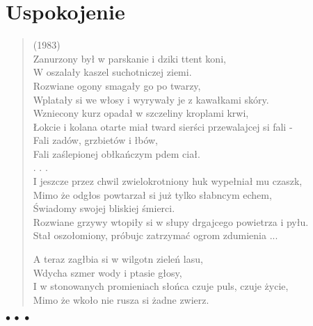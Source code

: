 \documentclass{article} %
\newenvironment{wierszd}[2]
	{\begin{verse} \hspace*{-1em}{\bf #1}\hfill{\small{(#2)}}\\[.5ex] }
	{\end{verse} \begin{center}$\bullet\ \bullet\ \bullet$\end{center}}
\newcommand{\chap}[1]{\newpage\section*{#1}}
\newcommand{\e}{\eob}
\renewcommand{\a}{\aob}
\renewcommand{\o}{\'{o}}
\newcommand{\n}{\'{n}}
\newcommand{\s}{\'{s}}
\renewcommand{\S}{\'{S}}
\newcommand{\ci}{\'{c}}
\begin{document}
\chap{Uspokojenie}\vspace*{-3ex}

\begin{wierszd}{}{1983}
Zanurzony by{\l} w parskanie i dziki t{\e}tent koni, \\  
W oszala{\l}y kaszel suchotniczej ziemi. \\ 
Rozwiane ogony smaga{\l}y go po twarzy, \\ 
Wplata{\l}y si{\e} we w{\l}osy i wyrywa{\l}y je z kawa{\l}kami sk{\o}ry. \\ 
Wzniecony kurz opada{\l} w szczeliny kroplami krwi, \\ 
{\L}okcie i kolana otarte mia{\l} tward{\a} sier{\s}ci{\a} przewalaj{\a}cej si{\e} fali - \\ 
Fali zad{\o}w, grzbiet{\o}w i {\l}b{\o}w, \\ 
Fali za{\s}lepionej ob{\l}{\a}ka{\n}czym p{\e}dem cia{\l}. \\ 
.  .  .  \\ 
 I jeszcze przez chwil{\e} zwielokrotniony huk wype{\l}nia{\l} mu czaszk{\e}, \\ 
Mimo \.{z}e odg{\l}os powtarza{\l} si{\e} ju\.{z} tylko s{\l}abn{\a}cym echem, \\ 
{\S}wiadomy swojej bliskiej {\s}mierci. \\  
Rozwiane grzywy wtopi{\l}y si{\e} w s{\l}upy drgaj{\a}cego powietrza i py{\l}u. \\ 
Sta{\l} oszo{\l}omiony, pr{\o}buj{\a}c zatrzyma{\ci} ogrom zdumienia ... 

A teraz zag{\l}{\e}bia si{\e} w wilgotn{\a} ziele{\n} lasu, \\ 
Wdycha szmer wody i ptasie g{\l}osy, \\ 
I w stonowanych promieniach s{\l}o{\n}ca czuje puls, czuje \.{z}ycie, \\ 
Mimo \.{z}e wko{\l}o nie rusza si{\e} \.{z}adne zwierz{\e}.

\end{wierszd}
\end{document}
